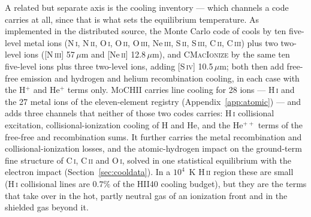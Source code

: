\documentclass[twocolumn,linenumbers]{aastex702}
\newcommand{\MoCHII}{\textsc{MoCHII}}
\newcommand{\HII}{H\,\textsc{ii}}
\newcommand{\HI}{H\,\textsc{i}}
\begin{document}
A related but separate axis is the cooling inventory --- which channels a
code carries at all, since that is what sets the equilibrium temperature.
As implemented in the distributed source, the Monte Carlo code of
\citet{wood2004} cools by ten five-level metal ions (N\,\textsc{i},
N\,\textsc{ii}, O\,\textsc{i}, O\,\textsc{ii}, O\,\textsc{iii},
Ne\,\textsc{iii}, S\,\textsc{ii}, S\,\textsc{iii}, C\,\textsc{ii},
C\,\textsc{iii}) plus two two-level ions ([N\,\textsc{iii}]
57\,$\mu$m and [Ne\,\textsc{ii}] 12.8\,$\mu$m), and \textsc{CMacIonize} by
the same ten five-level ions plus three two-level ions, adding
[S\,\textsc{iv}] 10.5\,$\mu$m; both then add free-free emission and
hydrogen and helium recombination cooling, in each case with the H$^{+}$
and He$^{+}$ terms only.  \MoCHII{}
carries line cooling for 28 ions --- \HI{} and the 27 metal ions of the
eleven-element registry (Appendix~\ref{app:atomic}) --- and adds three
channels that neither of those two codes carries: \HI{} collisional
excitation, collisional-ionization cooling of H and He, and the He$^{++}$
terms of the free-free and recombination sums.  It further carries the
metal recombination and collisional-ionization losses, and the
atomic-hydrogen impact on the ground-term fine structure of C\,\textsc{i},
C\,\textsc{ii} and O\,\textsc{i}, solved in one statistical equilibrium
with the electron impact (Section~\ref{sec:cooldata}).  In a $10^4$~K \HII{}
region these are small (\HI{} collisional lines are $0.7\%$ of the
HII40 cooling budget), but they are the terms that take over in the hot,
partly neutral gas of an ionization front and in the shielded gas beyond
it.
\end{document}
